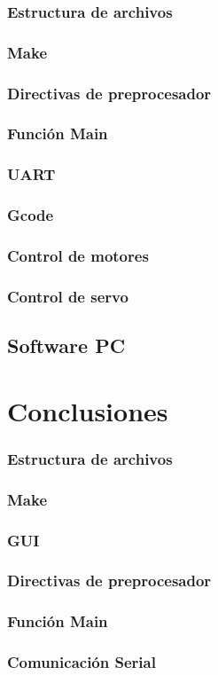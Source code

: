   \subsubsection{Estructura de archivos}
  \subsubsection{Make}
  \subsubsection{Directivas de preprocesador}
  \subsubsection{Función Main}
  \subsubsection{UART}
  \subsubsection{Gcode}
  \subsubsection{Control de motores}
  \subsubsection{Control de servo}
  \subsection{Software PC}
  \section{Conclusiones}
  \subsubsection{Estructura de archivos}
  \subsubsection{Make}
  \subsubsection{GUI}
  \subsubsection{Directivas de preprocesador}
  \subsubsection{Función Main}
  \subsubsection{Comunicación Serial}

  \nocite{atmega328Datasheet}
  \nocite{bjarneC++}
  \nocite{deitel}
  \nocite{make}
  \nocite{CProgramingMicro}
  {}
  



